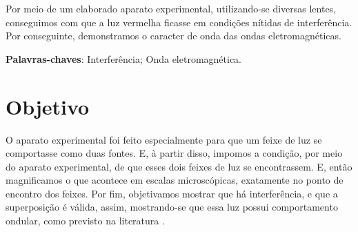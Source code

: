 \documentclass[
12pt,				%
openright,			%
oneside,			%
a4paper,			%
english,			%
french,				%
spanish,			%
brazil,				%
]{abntex2}
\begin{document}

\frenchspacing


\imprimircapa

\imprimirfolhaderosto*



\setlength{\absparsep}{18pt} %
\begin{resumo}
Por meio de um elaborado aparato experimental, utilizando-se diversas lentes,
conseguimos com que a luz vermelha ficasse em condições nítidas de
interferência. Por conseguinte, demonstramos o caracter de onda das ondas
eletromagnéticas.

  \noindent
  \textbf{Palavras-chaves}: Interferência; Onda eletromagnética.
\end{resumo}

\listoffigures*
\cleardoublepage

\listoftables*
\cleardoublepage


\tableofcontents*
\cleardoublepage


\textual

\chapter[Objetivo]{Objetivo}

O aparato experimental foi feito especialmente para que um feixe de luz se
comportasse como duas fontes. E, à partir disso, impomos a condição, por meio do
aparato experimental, de que esses dois feixes de luz se encontrassem. E, então
magnificamos o que acontece em escalas microscópicas, exatamente no ponto de
encontro dos feixes. Por fim, objetivamos mostrar que há interferência, e que a
superposição é válida, assim, mostrando-se que
essa luz possui comportamento ondular, como previsto na literatura \cite{rubinowicz1957}.
\end{document}
